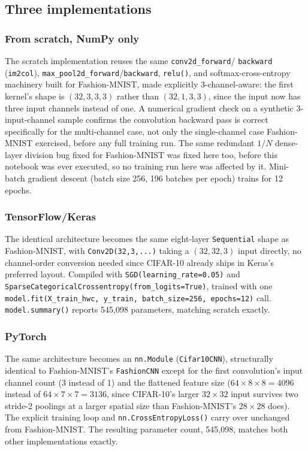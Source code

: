 \documentclass[11pt]{article}
\newcommand{\code}[1]{\texttt{#1}}
\begin{document}
\subsection{Three implementations}

\subsubsection{From scratch, NumPy only}

The scratch implementation reuses the same \code{conv2d\_forward}/
\code{backward} (\code{im2col}), \code{max\_pool2d\_forward}/\code{backward},
\code{relu()}, and softmax-cross-entropy machinery built for Fashion-MNIST,
made explicitly 3-channel-aware: the first kernel's shape is
$(32, 3, 3, 3)$ rather than $(32, 1, 3, 3)$, since the input now has three
input channels instead of one. A numerical gradient check on a synthetic
3-input-channel sample confirms the convolution backward pass is correct
specifically for the multi-channel case, not only the single-channel case
Fashion-MNIST exercised, before any full training run. The same redundant
$1/N$ dense-layer division bug fixed for Fashion-MNIST was fixed here too,
before this notebook was ever executed, so no training run here was affected
by it. Mini-batch gradient descent (batch size 256, 196 batches per epoch)
trains for 12 epochs.

\subsubsection{TensorFlow/Keras}

The identical architecture becomes the same eight-layer \code{Sequential}
shape as Fashion-MNIST, with \code{Conv2D(32,3,...)} taking a
$(32,32,3)$ input directly, no channel-order conversion needed since CIFAR-10
already ships in Keras's preferred layout. Compiled with
\code{SGD(learning\_rate=0.05)} and
\code{SparseCategoricalCrossentropy(from\_logits=True)}, trained with one
\code{model.fit(X\_train\_hwc, y\_train, batch\_size=256, epochs=12)} call.
\code{model.summary()} reports 545,098 parameters, matching scratch exactly.

\subsubsection{PyTorch}

The same architecture becomes an \code{nn.Module} (\code{Cifar10CNN}),
structurally identical to Fashion-MNIST's \code{FashionCNN} except for the
first convolution's input channel count (3 instead of 1) and the flattened
feature size ($64 \times 8 \times 8 = 4096$ instead of $64 \times 7 \times 7 =
3136$, since CIFAR-10's larger $32\times32$ input survives two
stride-2 poolings at a larger spatial size than Fashion-MNIST's $28\times28$
does). The explicit training loop and \code{nn.CrossEntropyLoss()} carry over
unchanged from Fashion-MNIST. The resulting parameter count, 545,098, matches
both other implementations exactly.
\end{document}

